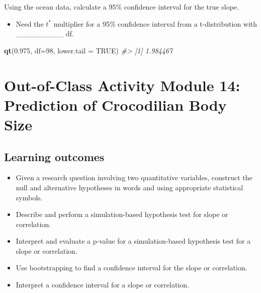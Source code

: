 \documentclass[
]{report}
\newenvironment{Shaded}{\begin{snugshade}}{\end{snugshade}}
\newcommand{\AttributeTok}[1]{\textcolor[rgb]{0.13,0.29,0.53}{#1}}
\newcommand{\CommentTok}[1]{\textcolor[rgb]{0.56,0.35,0.01}{\textit{#1}}}
\newcommand{\ConstantTok}[1]{\textcolor[rgb]{0.56,0.35,0.01}{#1}}
\newcommand{\DecValTok}[1]{\textcolor[rgb]{0.00,0.00,0.81}{#1}}
\newcommand{\FloatTok}[1]{\textcolor[rgb]{0.00,0.00,0.81}{#1}}
\newcommand{\FunctionTok}[1]{\textcolor[rgb]{0.13,0.29,0.53}{\textbf{#1}}}
\newcommand{\NormalTok}[1]{#1}
\providecommand{\tightlist}{%
  \setlength{\itemsep}{0pt}\setlength{\parskip}{0pt}}
\begin{document}
Using the ocean data, calculate a 95\% confidence interval for the true slope.

\begin{itemize}
\tightlist
\item
  Need the \(t^*\) multiplier for a 95\% confidence interval from a t-distribution with \_\_\_\_\_\_\_\_\_ df.
\end{itemize}

\begin{Shaded}
\begin{Highlighting}[]
\FunctionTok{qt}\NormalTok{(}\FloatTok{0.975}\NormalTok{, }\AttributeTok{df=}\DecValTok{98}\NormalTok{, }\AttributeTok{lower.tail =} \ConstantTok{TRUE}\NormalTok{)}
\CommentTok{\#\textgreater{} [1] 1.984467}
\end{Highlighting}
\end{Shaded}

\vspace{1in}

\newpage

\hypertarget{out-of-class-activity-module-14-prediction-of-crocodilian-body-size}{%
\section{Out-of-Class Activity Module 14: Prediction of Crocodilian Body Size}\label{out-of-class-activity-module-14-prediction-of-crocodilian-body-size}}


\hypertarget{learning-outcomes-28}{%
\subsection{Learning outcomes}\label{learning-outcomes-28}}

\begin{itemize}
\item
  Given a research question involving two quantitative variables, construct the null and alternative hypotheses
  in words and using appropriate statistical symbols.
\item
  Describe and perform a simulation-based hypothesis test for slope or correlation.
\item
  Interpret and evaluate a p-value for a simulation-based hypothesis test for a slope or correlation.
\item
  Use bootstrapping to find a confidence interval for the slope or correlation.
\item
  Interpret a confidence interval for a slope or correlation.
\end{itemize}
\end{document}
